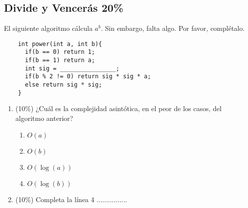 \documentclass[10 pt]{article}
\begin{document}
\begin{multicols}{2}
	\section{Divide y Vencerás 20\%}
	El siguiente algoritmo cálcula $a^b$. Sin embargo, falta algo. Por favor, complétalo.
	\begin{lstlisting}
	int power(int a, int b){
	  if(b == 0) return 1;
	  if(b == 1) return a;
	  int sig = ________________;
	  if(b % 2 != 0) return sig * sig * a;
	  else return sig * sig;
	}
	\end{lstlisting}
	\begin{enumerate}[label=\alph*)]
		\item (10\%) ¿Cuál es la complejidad asintótica, en el peor de los casos, del algoritmo anterior?
		\begin{enumerate}[label=\roman*)]
			\item $O(a)$
			\item $O(b)$
			\item $O(\log(a))$
			\item $O(\log(b))$
		\end{enumerate}
		\item (10\%) Completa la línea 4 ................
	\end{enumerate}
\end{multicols}
\end{document}

